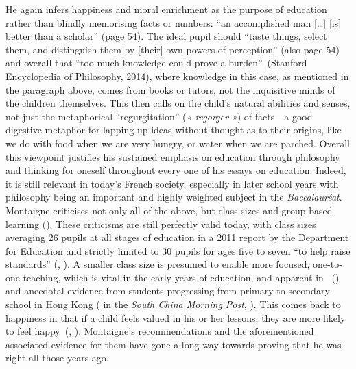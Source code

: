 \documentclass[12pt,a4paper]{article}
\begin{document}
He again infers happiness and moral enrichment as the purpose of
education rather than blindly memorising facts or numbers: ``an
accomplished man [\ldots] [is] better than a scholar'' (page 54). The
ideal pupil should ``taste things, select them, and distinguish them
by [their] own powers of perception'' (also page 54) and overall that
``too much knowledge could prove a burden''~(Stanford Encyclopedia of
Philosophy, 2014\nocite{montaigne-seop}), where knowledge in this
case, as mentioned in the paragraph above, comes from books or tutors,
not the inquisitive minds of the children themselves. This then calls
on the child's natural abilities and senses, not just the metaphorical
``regurgitation'' (\textit{« regorger »}) of facts---a good digestive
metaphor for lapping up ideas without thought as to their origins,
like we do with food when we are very hungry, or water when we are
parched. Overall this viewpoint justifies his sustained emphasis on
education through philosophy and thinking for oneself throughout every
one of his essays on education. Indeed, it is still relevant in
today's French society, especially in later school years with
philosophy being an important and highly weighted subject in the
\textit{Baccalaur\'eat}.\\

Montaigne criticises not only all of the above, but class sizes and
group-based learning (\citeauthor{fiche-bac}). These criticisms are
still perfectly valid today, with class sizes averaging 26 pupils at
all stages of education in a 2011 report by the Department for
Education\nocite{dfe-class-size} and strictly limited to 30 pupils for
ages five to seven ``to help raise standards''
(\citeauthor{govuk-hse-school}, \citeyear{govuk-hse-school}). A
smaller class size is presumed to enable more focused, one-to-one
teaching, which is vital in the early years of education, and apparent
in \citeauthor{krassel2014class}~(\citeyear{krassel2014class}) and
anecdotal evidence from students progressing from primary to secondary
school in Hong Kong (\citeauthor{hk-anecdote-class-size} in the
\textit{South China Morning Post}, \citeyear{hk-anecdote-class-size}).
This comes back to happiness in that if a child feels valued in his or
her lessons, they are more likely to feel
happy~(\citeauthor{barragan2008bienestar},
\citeyear{barragan2008bienestar}). Montaigne's recommendations and the
aforementioned associated evidence for them have gone a long way
towards proving that he was right all those years ago.\\
\end{document}
